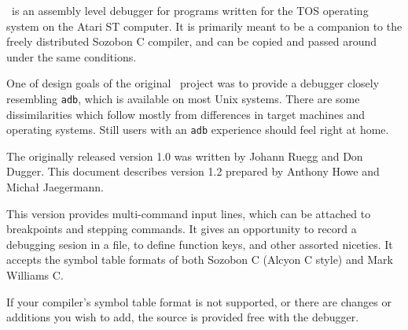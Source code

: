 \szadb\ is an assembly level debugger for programs written for the TOS 
operating system on the Atari ST computer.
It is primarily meant to be a companion
to the freely distributed Sozobon C compiler, and can be copied and passed
around under the same conditions.

One of design goals of the original \szadb\ project was to provide 
a debugger closely resembling {\tt adb},
which is available on most {\sc Unix} systems. There are some dissimilarities
which follow mostly from differences in target machines
and operating systems. Still users with an {\tt adb} experience should feel
right at home.

The originally released version 1.0 was written by Johann Ruegg and Don Dugger.
This document describes version 1.2 prepared by Anthony Howe and
Micha{\l} Jaegermann.

This version provides multi-command input lines, which can be attached to
breakpoints and stepping commands. It gives an opportunity to record a
debugging sesion in a file, to define function keys, and other assorted
niceties. It accepts the symbol table formats of both Sozobon C (Alcyon C style)
and Mark Williams C.

If your compiler's symbol table format is not supported, or there are changes
or additions you wish to add, the source is provided free with the debugger.






